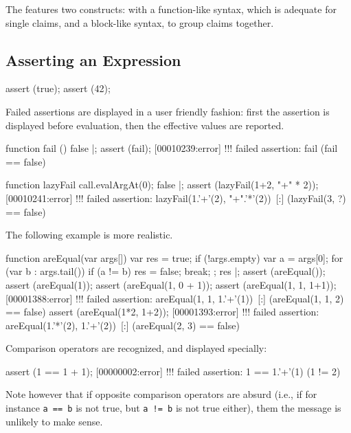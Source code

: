 The  features two constructs: with a function-like syntax,
which is adequate for single claims, and a block-like syntax, to group
claims together.

\subsection{Asserting an Expression}

\begin{urbiscript}
assert (true);
assert (42);
\end{urbiscript}

Failed assertions are displayed in a user friendly fashion: first the
assertion is displayed before evaluation, then the effective values are
reported.

\begin{urbiscript}
function fail () { false }|;
assert (fail);
[00010239:error] !!! failed assertion: fail (fail == false)

function lazyFail { call.evalArgAt(0); false }|;
assert (lazyFail(1+2, "+" * 2));
[00010241:error] !!! failed assertion: lazyFail(1.'+'(2), "+".'*'(2))\
[:] (lazyFail(3, ?) == false)
\end{urbiscript}

The following example is more realistic.

\begin{urbiscript}
function areEqual(var args[])
{
  var res = true;
  if (!args.empty)
  {
    var a = args[0];
    for (var b : args.tail())
      if (a != b)
      {
        res = false;
        break;
      }
  };
  res
}|;
assert (areEqual());
assert (areEqual(1));
assert (areEqual(1, 0 + 1));
assert (areEqual(1, 1, 1+1));
[00001388:error] !!! failed assertion: areEqual(1, 1, 1.'+'(1))\
[:] (areEqual(1, 1, 2) == false)
assert (areEqual(1*2, 1+2));
[00001393:error] !!! failed assertion: areEqual(1.'*'(2), 1.'+'(2))\
[:] (areEqual(2, 3) == false)
\end{urbiscript}

Comparison operators are recognized, and displayed specially:
\begin{urbiscript}
assert (1 == 1 + 1);
[00000002:error] !!! failed assertion: 1 == 1.'+'(1) (1 != 2)
\end{urbiscript}

Note however that if opposite comparison operators are absurd (i.e., if for
instance \lstinline|a == b| is not true, but \lstinline|a != b| is not true
either), them the message is unlikely to make sense.

